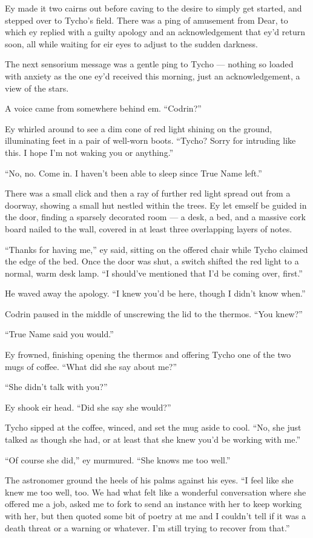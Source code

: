Ey made it two cairns out before caving to the desire to simply get started, and stepped over to Tycho's field. There was a ping of amusement from Dear, to which ey replied with a guilty apology and an acknowledgement that ey'd return soon, all while waiting for eir eyes to adjust to the sudden darkness.

The next sensorium message was a gentle ping to Tycho — nothing so loaded with anxiety as the one ey'd received this morning, just an acknowledgement, a view of the stars.

A voice came from somewhere behind em. ``Codrin?''

Ey whirled around to see a dim cone of red light shining on the ground, illuminating feet in a pair of well-worn boots. ``Tycho? Sorry for intruding like this. I hope I'm not waking you or anything.''

``No, no. Come in. I haven't been able to sleep since True Name left.''

There was a small click and then a ray of further red light spread out from a doorway, showing a small hut nestled within the trees. Ey let emself be guided in the door, finding a sparsely decorated room — a desk, a bed, and a massive cork board nailed to the wall, covered in at least three overlapping layers of notes.

``Thanks for having me,'' ey said, sitting on the offered chair while Tycho claimed the edge of the bed. Once the door was shut, a switch shifted the red light to a normal, warm desk lamp. ``I should've mentioned that I'd be coming over, first.''

He waved away the apology. ``I knew you'd be here, though I didn't know when.''

Codrin paused in the middle of unscrewing the lid to the thermos. ``You knew?''

``True Name said you would.''

Ey frowned, finishing opening the thermos and offering Tycho one of the two mugs of coffee. ``What did she say about me?''

``She didn't talk with you?''

Ey shook eir head. ``Did she say she would?''

Tycho sipped at the coffee, winced, and set the mug aside to cool. ``No, she just talked as though she had, or at least that she knew you'd be working with me.''

``Of course she did,'' ey murmured. ``She knows me too well.''

The astronomer ground the heels of his palms against his eyes. ``I feel like she knew me too well, too. We had what felt like a wonderful conversation where she offered me a job, asked me to fork to send an instance with her to keep working with her, but then quoted some bit of poetry at me and I couldn't tell if it was a death threat or a warning or whatever. I'm still trying to recover from that.''

